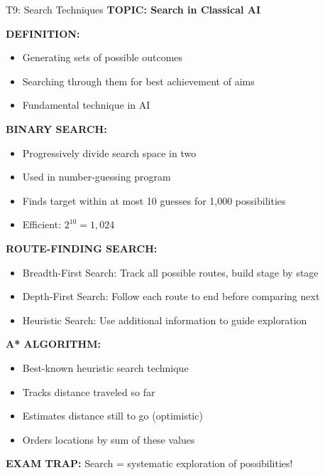 \documentclass[8pt]{beamer}
\begin{document}
	\begin{frame}{T9: Search Techniques}
		\fontsize{6.5}{7.5}\selectfont
		\textbf{TOPIC: Search in Classical AI}
		
		\vspace{0.1cm}
		\textbf{DEFINITION:}
		\begin{itemize}
			\item Generating sets of possible outcomes
			\item Searching through them for best achievement of aims
			\item Fundamental technique in AI
		\end{itemize}
		
		\vspace{0.1cm}
		\textbf{BINARY SEARCH:}
		\begin{itemize}
			\item Progressively divide search space in two
			\item Used in number-guessing program
			\item Finds target within at most 10 guesses for 1,000 possibilities
			\item Efficient: $2^{10} = 1,024$
		\end{itemize}
		
		\vspace{0.1cm}
		\textbf{ROUTE-FINDING SEARCH:}
		\begin{itemize}
			\item \textcolor{myblue}{Breadth-First Search:} Track all possible routes, build stage by stage
			\item \textcolor{myblue}{Depth-First Search:} Follow each route to end before comparing next
			\item \textcolor{myblue}{Heuristic Search:} Use additional information to guide exploration
		\end{itemize}
		
		\vspace{0.1cm}
		\textbf{A* ALGORITHM:}
		\begin{itemize}
			\item Best-known heuristic search technique
			\item Tracks distance traveled so far
			\item Estimates distance still to go (optimistic)
			\item Orders locations by sum of these values
		\end{itemize}
		
		\textcolor{myred}{\textbf{EXAM TRAP:}} Search = \textcolor{myblue}{systematic exploration of possibilities}!
	\end{frame}
	
\end{document}
